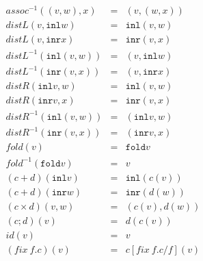 \documentclass[slidestop,compress,mathserif, xcolor=table]{beamer}
\begin{document}
\begin{frame}
{{\begin{columns}[totalwidth=0.8\textwidth]
\begin{column}{.5\textwidth}
          \begin{eqnarray*}
      assoc^{-1} ((v, w), x)                       &=& (v, (w, x))\\
      distL(v, \mathtt{inl} w)                     &=& \mathtt{inl} (v, w)\\
      distL(v, \mathtt{inr} x)                     &=& \mathtt{inr} (v, x)\\
      distL^{-1} (\mathtt{inl} (v, w))             &=& (v, \mathtt{inl} w)\\
      distL^{-1} (\mathtt{inr} (v, x))             &=& (v, \mathtt{inr} x)\\
      distR(\mathtt{inl} v, w)                     &=& \mathtt{inl} (v, w)\\
      distR(\mathtt{inr} v, x)                     &=& \mathtt{inr} (v, x)\\
      distR^{-1} (\mathtt{inl} (v, w))             &=& (\mathtt{inl} v, w)\\
      distR^{-1} (\mathtt{inr} (v, x))             &=& (\mathtt{inr} v, x)\\
      fold (v)                                     &=& \mathtt{fold} v\\
      fold^{-1} (\mathtt{fold} v)                  &=& v\\
      (c + d)(\mathtt{inl} v)                                      &=& \mathtt{inl} (c(v))\\
      (c + d)(\mathtt{inr} w)                                      &=& \mathtt{inr} (d(w))\\
      (c \times d)(v, w)                                       &=& (c(v), d(w))\\
      (c; d)(v)                                           &=& d(c(v))\\
      id(v)                                        &=& v\\
      (fix\ f.c)(v)                                 &=& c[fix\ f.c / f](v)
    \end{eqnarray*}
  \end{column}
  \end{columns}
  }
  }
\end{frame}
\end{document}

